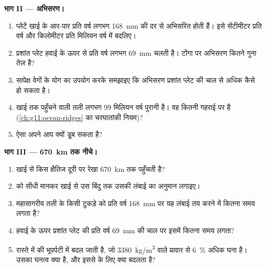 \begin{problem}
\medskip
\noindent\textbf{भाग II --- अभिसरण।}
\begin{enumerate}[resume]
  \item प्लेटें खाई के आर-पार प्रति वर्ष लगभग \qty{168}{mm} की दर से अभिसरित होती हैं।
        इसे सेंटीमीटर प्रति वर्ष और किलोमीटर प्रति मिलियन वर्ष में बदलिए।
  \item प्रशांत प्लेट हवाई के ऊपर से प्रति वर्ष लगभग \qty{69}{mm} चलती है।
        टोंगा पर अभिसरण कितने गुना तेज़ है?
  \item सापेक्ष वेगों के योग का उपयोग करके समझाइए कि अभिसरण
        प्रशांत प्लेट की चाल से अधिक कैसे हो सकता है।
  \item खाई तक पहुँचने वाली तली लगभग 99 मिलियन वर्ष पुरानी है। वह कितनी
        गहराई पर है (\cref{ch:g11:ocean-ridges} का चरघातांकी नियम)?
  \item ऐसा  अपने आप क्यों डूब सकता है?
\end{enumerate}

\medskip
\noindent\textbf{भाग III --- \qty{670}{km} तक नीचे।}
\begin{enumerate}[resume]
  \item खाई से किस क्षैतिज दूरी पर रेखा
        \qty{670}{km} तक पहुँचती है?
  \item {} को सीधी मानकर खाई से उस बिंदु तक उसकी लंबाई का
        अनुमान लगाइए।
  \item महासागरीय तली के किसी टुकड़े को प्रति वर्ष \qty{168}{mm} पर यह लंबाई
        तय करने में कितना समय लगता है?
  \item हवाई के ऊपर प्रशांत प्लेट की प्रति वर्ष \qty{69}{mm} की चाल पर इसमें कितना
        समय लगता?
  \item रास्ते में  की भूपर्पटी  में बदल जाती है, जो
        \qty{3380}{kg/m^3} वाले प्रावार से \qty{6}{\percent} अधिक घना है। उसका
        घनत्व क्या है, और इससे  के लिए क्या बदलता है?
\end{enumerate}


\end{problem}
